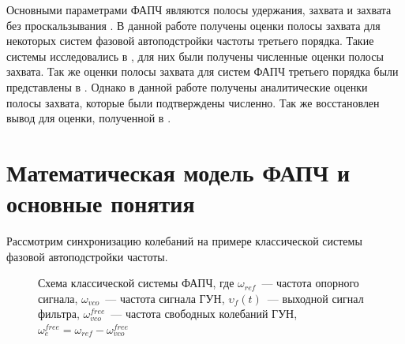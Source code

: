 \documentclass[a4paper,article,14pt]{extarticle}
\begin{document}
Основными параметрами ФАПЧ являются полосы удержания, захвата и захвата без проскальзывания \cite{shahgildyan}. В данной работе получены оценки полосы захвата для некоторых систем фазовой автоподстройки частоты третьего порядка. Такие системы исследовались в \cite{kuznetsov_article}, для них были получены численные оценки полосы захвата. Так же оценки полосы захвата для систем ФАПЧ третьего порядка были представлены в \cite{kuznetsov}. Однако в данной работе получены аналитические оценки полосы захвата, которые были подтверждены численно. Так же восстановлен вывод для оценки, полученной в \cite{kuznetsov}.


\newpage
\section{Математическая модель ФАПЧ и основные понятия}
Рассмотрим синхронизацию колебаний на примере классической системы фазовой автоподстройки частоты.
\begin{figure}[H]
\begin{center}
\end{center}
\caption{Схема классической системы ФАПЧ, где $\omega_{ref}$~--- частота опорного сигнала, $\omega_{vco}$~--- частота сигнала ГУН, $\upsilon_f(t)$~--- выходной сигнал фильтра, $\omega_{vco}^{free}$~--- частота свободных колебаний ГУН, $\omega_e^{free} = \omega_{ref}-\omega_{vco}^{free}$}
\end{figure}
\end{document}
